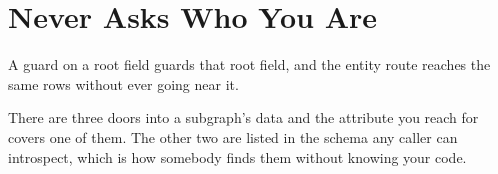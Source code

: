 \chapter{ Never Asks Who You Are}
\label{ch:entities-authorization}

A guard on a root field guards that root field, and the entity route reaches
the same rows without ever going near it.

There are three doors into a subgraph's data and the attribute you reach for
covers one of them. The other two are listed in the schema any caller can
introspect, which is how somebody finds them without knowing your code.







